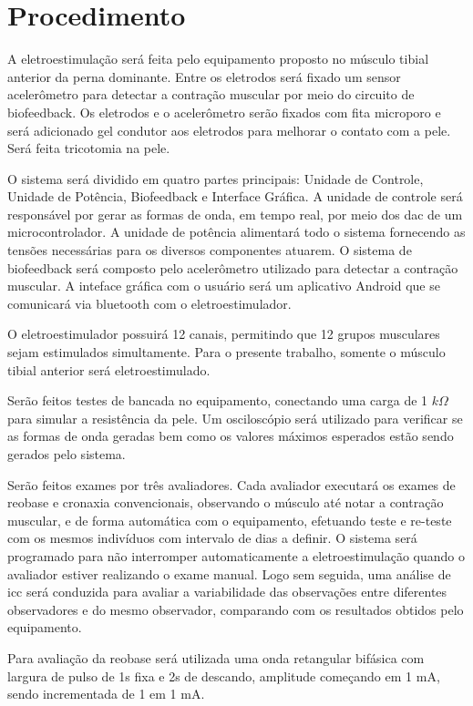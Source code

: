 \section{Procedimento}
A eletroestimulação será feita pelo equipamento proposto no músculo tibial anterior da perna dominante. Entre os eletrodos será fixado um sensor acelerômetro para detectar a contração muscular por meio do circuito de biofeedback. Os eletrodos e o acelerômetro serão fixados com fita microporo e será adicionado gel condutor aos eletrodos para melhorar o contato com a pele. Será feita tricotomia na pele.

O sistema será dividido em quatro partes principais: Unidade de Controle, Unidade de Potência, Biofeedback e Interface Gráfica. A unidade de controle será responsável por gerar as formas de onda, em tempo real, por meio dos \ac{dac} de um microcontrolador. A unidade de potência alimentará todo o sistema fornecendo as tensões necessárias para os diversos componentes atuarem. O sistema de biofeedback será composto pelo acelerômetro utilizado para detectar a contração muscular. A inteface gráfica com o usuário será um aplicativo Android que se comunicará via bluetooth com o eletroestimulador.

O eletroestimulador possuirá 12 canais, permitindo que 12 grupos musculares sejam estimulados simultamente. Para o presente trabalho, somente o músculo tibial anterior será eletroestimulado.

Serão feitos testes de bancada no equipamento, conectando uma carga de 1 $k\Omega$ para simular a resistência da pele. Um osciloscópio será utilizado para verificar se as formas de onda geradas bem como os valores máximos esperados estão sendo gerados pelo sistema.

Serão feitos exames por três avaliadores. Cada avaliador executará os exames de reobase e cronaxia convencionais, observando o músculo até notar a contração muscular, e de forma automática com o equipamento, efetuando teste e re-teste com os mesmos indivíduos com intervalo de dias a definir. O sistema será programado para não interromper automaticamente a eletroestimulação quando o avaliador estiver realizando o exame manual. Logo sem seguida, uma análise de \ac{icc} será conduzida para avaliar a variabilidade das observações entre diferentes observadores e do mesmo observador, comparando com os resultados obtidos pelo equipamento.

Para avaliação da reobase será utilizada uma onda retangular bifásica com largura de pulso de 1s fixa e 2s de descando, amplitude começando em 1 mA, sendo incrementada de 1 em 1 mA.

